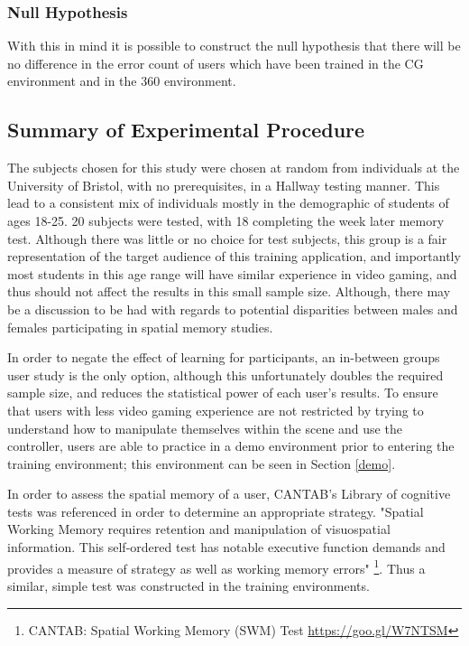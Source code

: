 \documentclass[ %
                    author={Elis Jones},
                supervisor={Dr. Kirsten Cater},
                    degree={BSc},
                     title={The Effect of Presentation Medium on Spatial Cognition},
                  subtitle={in the Virtual Environment},
                      year={2018} ]{dissertation}
\begin{document}
\subsubsection{Null Hypothesis}
With this in mind it is possible to construct the null hypothesis that there will be no difference in the error count of users which have been trained in the CG environment and in the 360 environment.


\subsection{Summary of Experimental Procedure}\label{cantab}
The subjects chosen for this study were chosen at random from individuals at the University of Bristol, with no prerequisites, in a Hallway testing manner. This lead to a consistent mix of individuals mostly in the demographic of students of ages 18-25. 20 subjects were tested, with 18 completing the week later memory test. Although there was little or no choice for test subjects, this group is a fair representation of the target audience of this training application, and importantly most students in this age range will have similar experience in video gaming, and thus should not affect the results in this small sample size. Although, there may be a discussion to be had with regards to potential disparities between males and females participating in spatial memory studies. 

In order to negate the effect of learning for participants, an in-between groups user study is the only option, although this unfortunately doubles the required sample size, and reduces the statistical power of  each user's results. To ensure that users with less video gaming experience are not restricted by trying to understand how to manipulate themselves within the scene and use the controller, users are able to practice in a demo environment prior to entering the training environment; this environment can be seen in Section \ref{demo}.

In order to assess the spatial memory of a user, CANTAB's Library of cognitive tests was referenced in order to determine an appropriate strategy. "Spatial Working Memory requires retention and manipulation of visuospatial information. This self-ordered test has notable executive function demands and provides a measure of strategy as well as working memory errors" \footnote{ CANTAB: Spatial Working Memory (SWM) Test \url{https://goo.gl/W7NTSM}}. Thus a similar, simple test was constructed in the training environments. 
\end{document}
